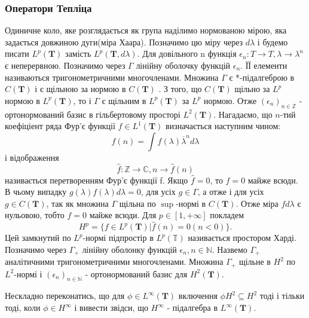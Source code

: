 \subsubsection[Оператори Тепліца]{Оператори Тепліца}
Одиничне коло, яке розглядається як група наділимо нормованою мірою, яка задається довжиною дуги(міра Хаара).
Позначимо цю міру через $d\lambda$ і будемо писати $L^p(\textbf{T})$ замість $L^p(\textbf{T},d\lambda)$.
Для довільного n функція $\epsilon_n: T \to T, \lambda \to \lambda^n$ є неперервною.
Позначимо через $\Gamma$ лінійну оболочку функцій $\epsilon_n$.
ЇЇ елементи називаються тригонометричними многочленами.
Множина $\Gamma$ є *-підалгеброю в $C(\textbf{T})$ і є щільною за нормою в $C(\textbf{T})$ .
З того, що $C(\textbf{T})$  щільно за $L^p$ нормою в $L^p(\textbf{T})$,
то і $\Gamma$ є щільним в $L^p(\textbf{T})$ за $L^p$ нормою.
Отже $(\epsilon_n)_{n \in \mathbb{Z}}$ - ортонормований базис в гільбертовому просторі $L^2(\textbf{T})$.
Нагадаємо, що $n$-тий коефіціент ряда Фур'є функції $f \in L^1(\textbf{T})$ визначається наступним чином:
\begin{equation*}
    \hat{f}(n) = \int f(\lambda)\overline{\lambda}^n d\lambda
\end{equation*}
і відображення
\begin{equation*}
    \hat{f}: \mathbb{Z} \to \mathbb{C}, n \to \hat{f}(n)
\end{equation*}
називається перетворенням Фур'є функції f.
Якщо $\hat{f} = 0$, то $f=0$ майже всюди.
В чьому випадку $g(\lambda)f(\lambda)d\lambda = 0$, для усіх $g \in \Gamma$, а отже і для усіх $g \in C(\textbf{T})$,
так як множина $\Gamma$ щільна по $\sup$-нормі в $C(\textbf{T})$.
Отже міра $f d\lambda$ є нульовою, тобто $f = 0$ майже всюди.
Для $p \in [1, +\infty]$ покладем
\begin{equation*}
    H^p = \{f \in L^p(\textbf{T}) | \hat{f}(n) = 0 (n < 0)\}.
\end{equation*}
Цей замкнутий по $L^p$-нормі підпростір в $L^p(\mathbb{T})$ називається простором Харді.
Позначимо через $\Gamma_+$ лінійну оболонку функцій $\epsilon_n, n \in \mathbb{N}$.
Назвемо $\Gamma_+$ \\ аналітичними тригонометричними многочленами.
Множина $\Gamma_+$ щільне в $H^2$ по $L^2$-нормі і $(\epsilon_n)_{n \in \mathbb{N}}$ - ортонормований базис для $H^2(\textbf{T})$.

Нескладно переконатись, що для $\phi \in L^{\infty}(\textbf{T})$ включення $\phi H^2 \subseteq H^2$ тоді і тільки тоді,
коли $\phi \in H^\infty$ і вивести звідси, що $H^\infty$ - підалгебра в $L^\infty(\textbf{T})$.

